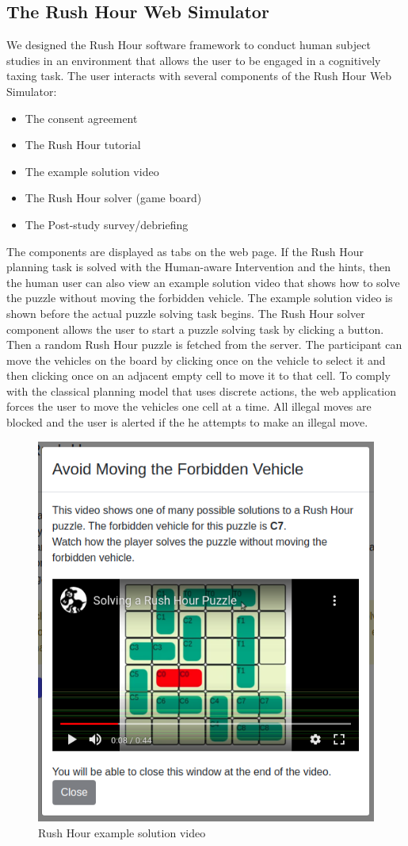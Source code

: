 \subsection{The Rush Hour Web Simulator}
We designed the Rush Hour software framework to conduct human subject studies in an environment that allows the user to be engaged in a cognitively taxing task. 
The user interacts with several components of the Rush Hour Web Simulator:
\begin{itemize}
\item The consent agreement
\item The Rush Hour tutorial
\item The example solution video
\item The Rush Hour solver (game board)
\item The Post-study survey/debriefing
\end{itemize} 
The components are displayed as tabs on the web page.
If the Rush Hour planning task is solved with the Human-aware Intervention and the hints, then the human user can also view an example solution video that shows how to solve the puzzle without moving the forbidden vehicle.
The example solution video is shown before the actual puzzle solving task begins.
The Rush Hour solver component allows the user to start a puzzle solving task by clicking a button. 
Then a random Rush Hour puzzle is fetched from the server. 
The participant can move the vehicles on the board by clicking once on the vehicle to select it and then clicking once on an adjacent empty cell to move it to that cell. 
To comply with the classical planning model that uses discrete actions, the web application forces the user to move the vehicles one cell at a time.
All illegal moves are blocked and the user is alerted if the he attempts to make an illegal move.
\begin{figure}[tpb]
  \centering
  \includegraphics[width=0.6\columnwidth, keepaspectratio=true]{img/help.png}
  \caption{Rush Hour example solution video}
  \label{fig:video}
\end{figure}

